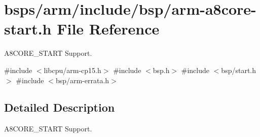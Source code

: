 \hypertarget{arm-a8core-start_8h}{}\section{bsps/arm/include/bsp/arm-\/a8core-\/start.h File Reference}
\label{arm-a8core-start_8h}


A8\+C\+O\+R\+E\+\_\+\+S\+T\+A\+RT Support.  


{\ttfamily \#include $<$libcpu/arm-\/cp15.\+h$>$}\newline
{\ttfamily \#include $<$bsp.\+h$>$}\newline
{\ttfamily \#include $<$bsp/start.\+h$>$}\newline
{\ttfamily \#include $<$bsp/arm-\/errata.\+h$>$}\newline


\subsection{Detailed Description}
A8\+C\+O\+R\+E\+\_\+\+S\+T\+A\+RT Support. 

